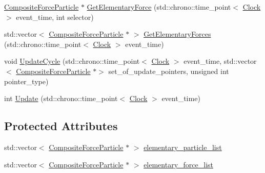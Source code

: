 \begin{DoxyCompactItemize}
\item 
\mbox{\hyperlink{classCompositeForceParticle}{Composite\+Force\+Particle}} $\ast$ \mbox{\hyperlink{classCompositeForceParticle_a63b3daf44517c90bb805b6612dd26acc}{Get\+Elementary\+Force}} (std\+::chrono\+::time\+\_\+point$<$ \mbox{\hyperlink{universe_8h_a0ef8d951d1ca5ab3cfaf7ab4c7a6fd80}{Clock}} $>$ event\+\_\+time, int selector)
\item 
std\+::vector$<$ \mbox{\hyperlink{classCompositeForceParticle}{Composite\+Force\+Particle}} $\ast$ $>$ \mbox{\hyperlink{classCompositeForceParticle_a2e9da0590067cf243c0f2d239f712e7f}{Get\+Elementary\+Forces}} (std\+::chrono\+::time\+\_\+point$<$ \mbox{\hyperlink{universe_8h_a0ef8d951d1ca5ab3cfaf7ab4c7a6fd80}{Clock}} $>$ event\+\_\+time)
\item 
void \mbox{\hyperlink{classCompositeForceParticle_a578d87e48246ef83f39dce070dff541e}{Update\+Cycle}} (std\+::chrono\+::time\+\_\+point$<$ \mbox{\hyperlink{universe_8h_a0ef8d951d1ca5ab3cfaf7ab4c7a6fd80}{Clock}} $>$ event\+\_\+time, std\+::vector$<$ \mbox{\hyperlink{classCompositeForceParticle}{Composite\+Force\+Particle}} $\ast$$>$ set\+\_\+of\+\_\+update\+\_\+pointers, unsigned int pointer\+\_\+type)
\item 
int \mbox{\hyperlink{classCompositeForceParticle_a69b47aaf17ab6faa396c2f6e6c85b2e3}{Update}} (std\+::chrono\+::time\+\_\+point$<$ \mbox{\hyperlink{universe_8h_a0ef8d951d1ca5ab3cfaf7ab4c7a6fd80}{Clock}} $>$ event\+\_\+time)
\end{DoxyCompactItemize}
\subsection*{Protected Attributes}
\begin{DoxyCompactItemize}
\item 
std\+::vector$<$ \mbox{\hyperlink{classCompositeForceParticle}{Composite\+Force\+Particle}} $\ast$ $>$ \mbox{\hyperlink{classCompositeForceParticle_a1f5ab59857b8517af69205178f04abe9}{elementary\+\_\+particle\+\_\+list}}
\item 
std\+::vector$<$ \mbox{\hyperlink{classCompositeForceParticle}{Composite\+Force\+Particle}} $\ast$ $>$ \mbox{\hyperlink{classCompositeForceParticle_a00d5ce181c8d4b1df0d46ff23a8fb1b8}{elementary\+\_\+force\+\_\+list}}
\end{DoxyCompactItemize}
